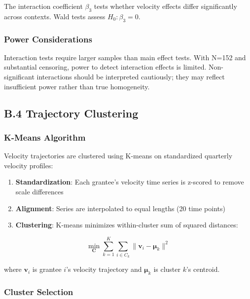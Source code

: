 \documentclass[
  12pt,
  letterpaper,
]{article}
\providecommand{\tightlist}{%
  \setlength{\itemsep}{0pt}\setlength{\parskip}{0pt}}
\begin{document}
The interaction coefficient \(\beta_3\) tests whether velocity effects
differ significantly across contexts. Wald tests assess
\(H_0: \beta_3 = 0\).

\subsubsection{Power Considerations}\label{power-considerations}

Interaction tests require larger samples than main effect tests. With
N=152 and substantial censoring, power to detect interaction effects is
limited. Non-significant interactions should be interpreted cautiously;
they may reflect insufficient power rather than true homogeneity.

\subsection{B.4 Trajectory Clustering}\label{b.4-trajectory-clustering}

\subsubsection{K-Means Algorithm}\label{k-means-algorithm}

Velocity trajectories are clustered using K-means on standardized
quarterly velocity profiles:

\begin{enumerate}
\def\labelenumi{\arabic{enumi}.}
\tightlist
\item
  \textbf{Standardization}: Each grantee's velocity time series is
  z-scored to remove scale differences
\item
  \textbf{Alignment}: Series are interpolated to equal lengths (20 time
  points)
\item
  \textbf{Clustering}: K-means minimizes within-cluster sum of squared
  distances:
\end{enumerate}

\[
\min_{\mathbf{C}} \sum_{k=1}^{K} \sum_{i \in C_k} \| \mathbf{v}_i - \boldsymbol{\mu}_k \|^2
\]

where \(\mathbf{v}_i\) is grantee \(i\)'s velocity trajectory and
\(\boldsymbol{\mu}_k\) is cluster \(k\)'s centroid.

\subsubsection{Cluster Selection}\label{cluster-selection}
\end{document}
